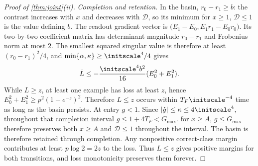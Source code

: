 \begin{proof}[Proof of \cref{thm:joint}(ii)]
\emph{Completion and retention.}
In the basin, $r_0-r_1\ge b$: the contrast increases with $x$ and decreases with $\mathcal D$, so its minimum for $x\ge1$, $\mathcal D\le1$
is the value defining $b$. The readout gradient vector is
$\bigl(E_1-E_0,E_1r_1-E_0r_0\bigr)$.
Its two-by-two coefficient matrix has determinant magnitude $r_0-r_1$ and Frobenius norm at most $2$.
The smallest squared singular value is therefore at least $(r_0-r_1)^2/4$, and
$\min\{\alpha,\kappa\}\ge\initscale^4/4$ gives
\[
 \dot L\le-\frac{\initscale^4b^2}{16}(E_0^2+E_1^2).
\]
While $L\ge z$, at least one example has loss at least $z$, hence
$E_0^2+E_1^2\ge p^2(1-e^{-z})^2$. Therefore $L\le z$ occurs within $T_F\initscale^{-4}$ time as long as the basin persists.
At entry $g<1$. Since $|\dot g|\le\kappa\le4\initscale^4$, throughout that completion interval
$g\le1+4T_F<G_{\max}$.  for $x\ge A$, $g\le G_{\max}$ therefore preserves both $x\ge A$ and $\mathcal D\le1$ throughout the interval.
The basin is therefore retained through completion.
Any nonpositive correct-class margin contributes at least $p\log2=2z$ to the loss. Thus $L\le z$ gives positive margins for both transitions, and loss monotonicity preserves them forever.
\end{proof}


